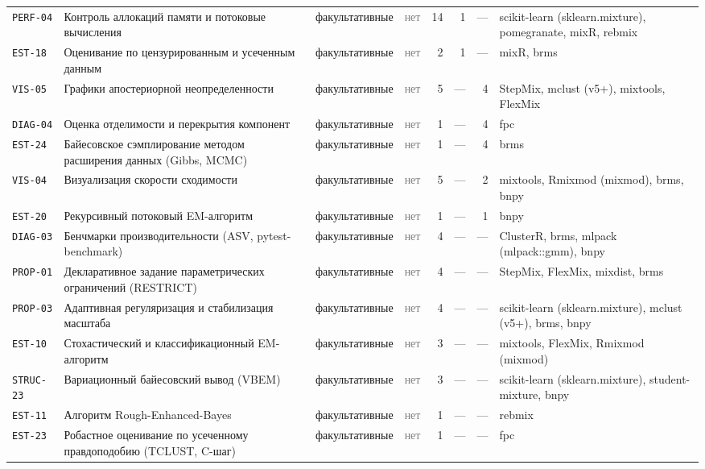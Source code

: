 \documentclass[10pt,a4paper]{article}
\begin{document}
\begin{landscape}
{\begin{longtable}{@{}l >{\raggedright\arraybackslash}p{8.2cm} l l r r r >{\raggedright\arraybackslash}p{6.2cm}@{}}
\texttt{PERF-04} & Контроль аллокаций памяти и потоковые вычисления & факультативные & \textcolor{gray}{нет} & 14 & 1 & --- & scikit-learn (sklearn.mixture), pomegranate, mixR, rebmix \\
\texttt{EST-18} & Оценивание по цензурированным и усеченным данным & факультативные & \textcolor{gray}{нет} & 2 & 1 & --- & mixR, brms \\
\texttt{VIS-05} & Графики апостериорной неопределенности & факультативные & \textcolor{gray}{нет} & 5 & --- & 4 & StepMix, mclust (v5+), mixtools, FlexMix \\
\texttt{DIAG-04} & Оценка отделимости и перекрытия компонент & факультативные & \textcolor{gray}{нет} & 1 & --- & 4 & fpc \\
\texttt{EST-24} & Байесовское сэмплирование методом расширения данных (Gibbs, MCMC) & факультативные & \textcolor{gray}{нет} & 1 & --- & 4 & brms \\
\texttt{VIS-04} & Визуализация скорости сходимости & факультативные & \textcolor{gray}{нет} & 5 & --- & 2 & mixtools, Rmixmod (mixmod), brms, bnpy \\
\texttt{EST-20} & Рекурсивный потоковый EM-алгоритм & факультативные & \textcolor{gray}{нет} & 1 & --- & 1 & bnpy \\
\texttt{DIAG-03} & Бенчмарки производительности (ASV, pytest-benchmark) & факультативные & \textcolor{gray}{нет} & 4 & --- & --- & ClusterR, brms, mlpack (mlpack::gmm), bnpy \\
\texttt{PROP-01} & Декларативное задание параметрических ограничений (RESTRICT) & факультативные & \textcolor{gray}{нет} & 4 & --- & --- & StepMix, FlexMix, mixdist, brms \\
\texttt{PROP-03} & Адаптивная регуляризация и стабилизация масштаба & факультативные & \textcolor{gray}{нет} & 4 & --- & --- & scikit-learn (sklearn.mixture), mclust (v5+), brms, bnpy \\
\texttt{EST-10} & Стохастический и классификационный EM-алгоритм & факультативные & \textcolor{gray}{нет} & 3 & --- & --- & mixtools, FlexMix, Rmixmod (mixmod) \\
\texttt{STRUC-23} & Вариационный байесовский вывод (VBEM) & факультативные & \textcolor{gray}{нет} & 3 & --- & --- & scikit-learn (sklearn.mixture), student-mixture, bnpy \\
\texttt{EST-11} & Алгоритм Rough-Enhanced-Bayes & факультативные & \textcolor{gray}{нет} & 1 & --- & --- & rebmix \\
\texttt{EST-23} & Робастное оценивание по усеченному правдоподобию (TCLUST, C-шаг) & факультативные & \textcolor{gray}{нет} & 1 & --- & --- & fpc \\

\end{longtable}}
\end{landscape}
\end{document}
